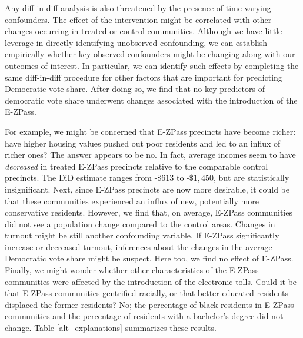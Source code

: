 
Any diff-in-diff analysis is also threatened by the presence of time-varying confounders. The effect of the intervention might be correlated with other changes occurring in treated or control communities. Although we have little leverage in directly identifying unobserved confounding, we can establish empirically whether key observed confounders might be changing along with our outcomes of interest. In particular, we can identify such effects by completing the same diff-in-diff procedure for other factors that are important for predicting Democratic vote share. After doing so, we find that no key predictors of democratic vote share underwent changes associated with the introduction of the E-ZPass. 

For example, we might be concerned that E-ZPass precincts have become richer: have higher housing values pushed out poor residents and led to an influx of richer ones? The answer appears to be no. In fact, average incomes seem to have \emph{decreased} in treated E-ZPass precincts relative to the comparable control precincts. The DiD estimate ranges from -$\$613$ to -$\$1,450$, but are statistically insignificant. Next, since E-ZPass precincts are now more desirable, it could be that these communities experienced an influx of new, potentially more conservative residents. However, we find that, on average, E-ZPass communities did not see a population change compared to the control areas. Changes in turnout might be still another confounding variable. If E-ZPass significantly increase or decreased turnout, inferences about the changes in the average Democratic vote share might be suspect. Here too, we find no effect of E-ZPass. Finally, we might wonder whether other characteristics of the E-ZPass communities were affected by the introduction of the electronic tolls. Could it be that E-ZPass communities gentrified racially, or that better educated residents displaced the former residents? No; the percentage of black residents in E-ZPass communities and the percentage of residents with a bachelor's degree did not change. Table \ref{alt_explanations} summarizes these results. 


